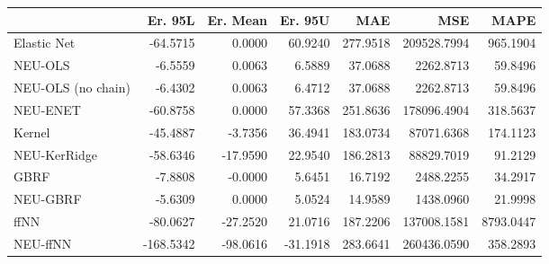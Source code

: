 \begin{tabular}{lrrrrrr}
\toprule
{} &   Er. 95L &  Er. Mean &  Er. 95U &      MAE &         MSE &      MAPE \\
\midrule
Elastic Net        &  -64.5715 &    0.0000 &  60.9240 & 277.9518 & 209528.7994 &  965.1904 \\
NEU-OLS            &   -6.5559 &    0.0063 &   6.5889 &  37.0688 &   2262.8713 &   59.8496 \\
NEU-OLS (no chain) &   -6.4302 &    0.0063 &   6.4712 &  37.0688 &   2262.8713 &   59.8496 \\
NEU-ENET           &  -60.8758 &    0.0000 &  57.3368 & 251.8636 & 178096.4904 &  318.5637 \\
Kernel             &  -45.4887 &   -3.7356 &  36.4941 & 183.0734 &  87071.6368 &  174.1123 \\
NEU-KerRidge       &  -58.6346 &  -17.9590 &  22.9540 & 186.2813 &  88829.7019 &   91.2129 \\
GBRF               &   -7.8808 &   -0.0000 &   5.6451 &  16.7192 &   2488.2255 &   34.2917 \\
NEU-GBRF           &   -5.6309 &    0.0000 &   5.0524 &  14.9589 &   1438.0960 &   21.9998 \\
ffNN               &  -80.0627 &  -27.2520 &  21.0716 & 187.2206 & 137008.1581 & 8793.0447 \\
NEU-ffNN           & -168.5342 &  -98.0616 & -31.1918 & 283.6641 & 260436.0590 &  358.2893 \\
\bottomrule
\end{tabular}
